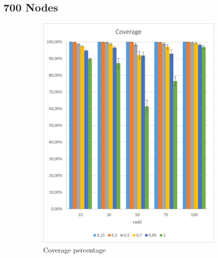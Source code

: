 \subsection{700 Nodes}
\begin{figure}[H]
\centering
\begin{subfigure}{.5\textwidth}
  \centering
  \includegraphics[width=1\linewidth]{./images/700CoverageCI.png}
  \caption{Coverage percentage}
  \label{fig:sub1}
\end{subfigure}%
\begin{subfigure}{.5\textwidth}
  \centering

\end{subfigure}
\end{figure}

